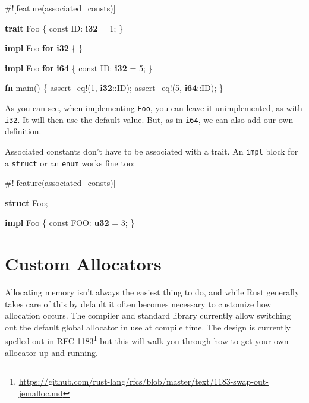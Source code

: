 \documentclass[a4paper,]{book}
\newenvironment{Shaded}{\begin{snugshade}}{\end{snugshade}}
\newcommand{\KeywordTok}[1]{\textcolor[rgb]{0.13,0.29,0.53}{\textbf{{#1}}}}
\newcommand{\DecValTok}[1]{\textcolor[rgb]{0.00,0.00,0.81}{{#1}}}
\newcommand{\OtherTok}[1]{\textcolor[rgb]{0.56,0.35,0.01}{{#1}}}
\newcommand{\NormalTok}[1]{{#1}}
\renewcommand{\href}[2]{#2\footnote{\url{#1}}}
\begin{document}
\begin{Shaded}
\begin{Highlighting}[]
\NormalTok{#![feature(associated_consts)]}

\KeywordTok{trait} \NormalTok{Foo \{}
    \NormalTok{const ID: }\KeywordTok{i32} \NormalTok{= }\DecValTok{1}\NormalTok{;}
\NormalTok{\}}

\KeywordTok{impl} \NormalTok{Foo }\KeywordTok{for} \KeywordTok{i32} \NormalTok{\{}
\NormalTok{\}}

\KeywordTok{impl} \NormalTok{Foo }\KeywordTok{for} \KeywordTok{i64} \NormalTok{\{}
    \NormalTok{const ID: }\KeywordTok{i32} \NormalTok{= }\DecValTok{5}\NormalTok{;}
\NormalTok{\}}

\KeywordTok{fn} \NormalTok{main() \{}
    \OtherTok{assert_eq!}\NormalTok{(}\DecValTok{1}\NormalTok{, }\KeywordTok{i32}\NormalTok{::ID);}
    \OtherTok{assert_eq!}\NormalTok{(}\DecValTok{5}\NormalTok{, }\KeywordTok{i64}\NormalTok{::ID);}
\NormalTok{\}}
\end{Highlighting}
\end{Shaded}

As you can see, when implementing \texttt{Foo}, you can leave it
unimplemented, as with \texttt{i32}. It will then use the default value.
But, as in \texttt{i64}, we can also add our own definition.

Associated constants don't have to be associated with a trait. An
\texttt{impl} block for a \texttt{struct} or an \texttt{enum} works fine
too:

\begin{Shaded}
\begin{Highlighting}[]
\NormalTok{#![feature(associated_consts)]}

\KeywordTok{struct} \NormalTok{Foo;}

\KeywordTok{impl} \NormalTok{Foo \{}
    \NormalTok{const FOO: }\KeywordTok{u32} \NormalTok{= }\DecValTok{3}\NormalTok{;}
\NormalTok{\}}
\end{Highlighting}
\end{Shaded}

\section{Custom Allocators}\label{sec--custom-allocators}

Allocating memory isn't always the easiest thing to do, and while Rust
generally takes care of this by default it often becomes necessary to
customize how allocation occurs. The compiler and standard library
currently allow switching out the default global allocator in use at
compile time. The design is currently spelled out in
\href{https://github.com/rust-lang/rfcs/blob/master/text/1183-swap-out-jemalloc.md}{RFC
1183} but this will walk you through how to get your own allocator up
and running.
\end{document}
